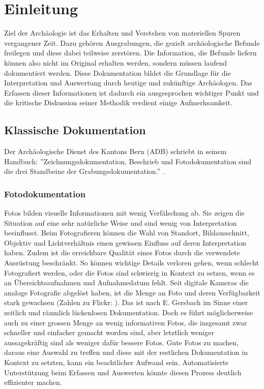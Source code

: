 \chapter{Einleitung}
	Ziel der Archäologie ist das Erhalten und Verstehen von materiellen Spuren vergangener Zeit. Dazu gehören Ausgrabungen, die gezielt archäologische Befunde freilegen und diese dabei teilweise zerstören. Die Information, die Befunde liefern können also nicht im Original erhalten werden, sondern müssen laufend dokumentiert werden. Diese Dokumentation bildet die Grundlage für die Interpretation und Auswertung durch heutige und zukünftige Archäologen.
	Das Erfassen dieser Informationen ist dadurch ein ausgesprochen wichtiger Punkt und die kritische Diskussion seiner Methodik verdient einige Aufmerksamkeit.
	
	\section{Klassische Dokumentation}
		Der Archäologische Dienst des Kantons Bern (ADB) schriebt in seinem Handbuch: ''Zeichnungsdokumentation, Beschrieb und Fotodokumentation sind die drei Standbeine der Grabungsdokumentation.'' \cite{adb:handbuch}.
		
		\subsection{Fotodokumentation}
			Fotos bilden visuelle Informationen mit wenig Verfälschung ab. Sie zeigen die Situation auf eine sehr natürliche Weise und sind wenig von Interpretation beeinflusst.
			Beim Fotografieren können die Wahl von Standort, Bildausschnitt, Objektiv und Lichtverhältnis einen gewissen Einfluss auf deren Interpretation haben. Zudem ist die erreichbare Qualität eines Fotos durch die verwendete Ausrüstung beschränkt.
			So können wichtige Details verloren gehen, wenn schlecht Fotografiert werden, oder die Fotos sind schwierig in Kontext zu setzen, wenn es an Übersichtsaufnahmen und Aufnahmedatum fehlt.
			Seit digitale Kameras die analoge Fotografie abgelöst haben, ist die Menge an Foto und deren Verfügbarkeit stark gewachsen (Zahlen zu Flickr: \cite{flickr:number}). Das ist nach E. Gersbach \cite{ausgrabung_heute} im Sinne einer zeitlich und räumlich lückenlosen Dokumentation.
			Doch es führt möglicherweise auch zu einer grossen Menge an wenig informativen Fotos, die insgesamt zwar schneller und einfacher gemacht worden sind, aber letztlich weniger aussagekräftig sind als weniger dafür bessere Fotos.
			Gute Fotos zu machen, daraus eine Auswahl zu treffen und diese mit der restlichen Dokumentation in Kontext zu setzten, kann ein beachtlicher Aufwand sein.
			Automatisierte Unterstützung beim Erfassen und Auswerten könnte diesen Prozess deutlich effizienter machen.

